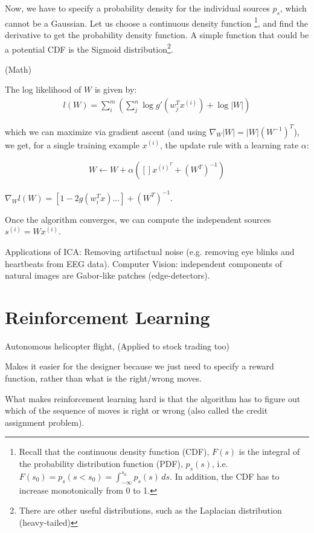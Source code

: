 \documentclass[letterpaper,10pt]{article}
\begin{document}
Now, we have to specify a probability density for the individual sources $p_s$, which cannot be a Gaussian. Let us choose a continuous density function \footnote{Recall that the continuous density function (CDF), $F(s)$ is the integral of the probability distribution function (PDF), $p_s(s)$, i.e. $F(s_0) = p_s (s<s_0) = \int_{-\infty}^{s_0} p_s (s) \, ds $. In addition, the CDF has to increase monotonically from 0 to 1.}, and find the derivative to get the probability density function. A simple function that could be a potential CDF is the Sigmoid distribution\footnote{There are other useful distributions, such as the Laplacian distribution (heavy-tailed)}.


(Math)

The log likelihood of $W$ is given by:
\begin{align}
l(W) = \sum_i^m \left( \sum_j^n \log g'(w_j^T x^{(i)}) + \log \vert W \vert \right)
\end{align}

which we can maximize via gradient ascent (and using $\nabla_W |W| = |W|(W^{-1})^{T}$), we get, for a single training example $x^{(i)}$, the update rule with a learning rate $\alpha$:


\begin{align}
W \leftarrow W + \alpha \left( [] x^{(i)^T} + (W^T)^{-1} \right)
\end{align}

$\nabla_W l(W) = [1-2g(w_i^Tx) ... ] + (W^T)^{-1}$.

Once the algorithm converges, we can compute the independent sources $s^{(i)} = W x^{(i)}$.

Applications of ICA: Removing artifactual noise (e.g. removing eye blinks and heartbeats from EEG data). Computer Vision: independent components of natural images are Gabor-like patches (edge-detectors).


\section{Reinforcement Learning}


Autonomous helicopter flight, (Applied to stock trading too)

Makes it easier for the designer because we just need to specify a reward function, rather than what is the right/wrong moves.

What makes reinforcement learning hard is that the algorithm has to figure out which of the sequence of moves is right or wrong (also called the credit assignment problem).
\end{document}
